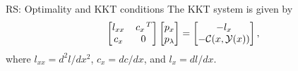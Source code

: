 \documentclass{beamer}
\newcommand{\C}{\mathcal{C}}
\newcommand{\Y}{\mathcal{Y}}
\begin{document}
\begin{frame}{RS: Optimality and KKT conditions}
    The KKT system is given by
    \begin{equation*} %
        \begin{bmatrix}
            l_{xx} &  \T{c_x} \\
             c_x  & 0\\
        \end{bmatrix}
        \begin{bmatrix}
            p_x \\
            p_{\lambda} \\
        \end{bmatrix}
        =
        \begin{bmatrix}
            -l_x \\ 
            -\C(x,\Y(x)) \\
        \end{bmatrix}
        ,
    \end{equation*}
    where $l_{xx} = d^2l/dx^2$, $c_x = dc/dx$, and $l_x = dl/dx$.
  \end{frame}
\end{document}
